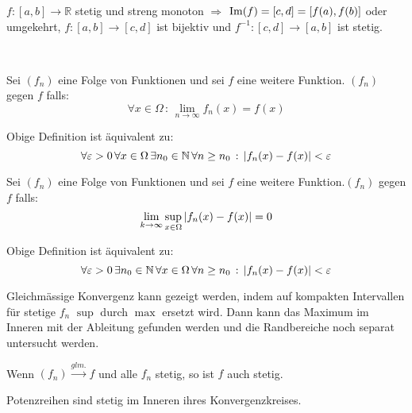 \begin{multicols}{2}
\begin{theorem}
			$f:\left[ a, b \right] \to \mathbb{R}$ stetig und streng monoton $\Rightarrow$ $\mathrm{Im} (f) = [c,d] = [f(a),f(b)]$ oder umgekehrt, $f:[a,b] \to [c,d]$ ist bijektiv und $f^{-1} : [c,d] \to [a,b]$ ist stetig.
		\end{theorem}
		\\[1em]
		\begin{definition}
			Sei $(f_n)$ eine Folge von Funktionen und sei $f$ eine weitere Funktion. $(f_n)$  gegen $f$ falls:
			$$ \forall x \in \Omega \, : \,  \lim\limits_{n \to \infty} f_n (x) = f(x) $$
		\end{definition}
		\begin{theorem}
			Obige Definition ist äquivalent zu:
			$$ \forall \varepsilon > 0 \, \forall x \in \Omega \, \exists n_0 \in \mathbb{N} \, \forall n \geq n_0 \, : \, \left\vert f_n (x) - f(x) \right\vert < \varepsilon $$
		\end{theorem}
		\begin{definition}
			Sei $(f_n)$ eine Folge von Funktionen und sei $f$ eine weitere Funktion.$(f_n)$  gegen $f$ falls:
			$$ \lim\limits_{k \to \infty} \sup\limits_{x \in \Omega} \left\vert f_n(x) - f(x) \right\vert = 0$$
		\end{definition}
		\begin{theorem}
			Obige Definition ist äquivalent zu:
			$$ \forall \varepsilon > 0 \, \exists n_0 \in \mathbb{N} \, \forall x \in \Omega \, \forall n \geq n_0 \, : \, \left\vert f_n (x) - f(x) \right\vert < \varepsilon $$
		\end{theorem}
		\begin{proofhelp}
			Gleichmässige Konvergenz kann gezeigt werden, indem auf kompakten Intervallen für stetige $f_n$ $\sup$ durch $\max$ ersetzt wird. 
			Dann kann das Maximum im Inneren mit der Ableitung gefunden werden und die Randbereiche noch separat untersucht werden.
		\end{proofhelp}
		\begin{theorem}
			Wenn $(f_n) \xrightarrow{glm.} f$ und alle $f_n$ stetig, so ist $f$ auch stetig.
		\end{theorem}
		\begin{corollary}
			Potenzreihen sind stetig im Inneren ihres Konvergenzkreises.
		\end{corollary}
\end{multicols}